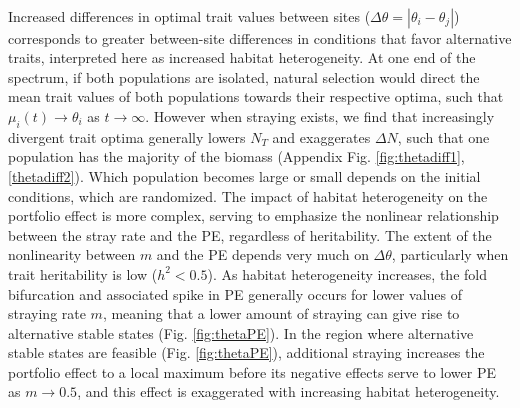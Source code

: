 \documentclass[twocolumn,preprintnumbers,amsmath,amssymb,superscriptaddress]{revtex4}
\begin{document}
\\ 
\noindent Increased differences in optimal trait values between sites ($\Delta\theta = \left|\theta_i - \theta_j\right|$) corresponds to greater between-site differences in conditions that favor alternative traits, interpreted here as increased habitat heterogeneity.
At one end of the spectrum, if both populations are isolated, natural selection would direct the mean trait values of both populations towards their respective optima, such that $\mu_i(t) \rightarrow \theta_i$ as $t\rightarrow\infty$.
However when straying exists, we find that increasingly divergent trait optima generally lowers $N_T$ and exaggerates $\Delta N$, such that one population has the majority of the biomass (Appendix Fig. \ref{fig:thetadiff1},\ref{thetadiff2}).
Which population becomes large or small depends on the initial conditions, which are randomized. 
The impact of habitat heterogeneity on the portfolio effect is more complex, serving to emphasize the nonlinear relationship between the stray rate and the PE, regardless of heritability.
The extent of the nonlinearity between $m$ and the PE depends very much on $\Delta\theta$, particularly when trait heritability is low ($h^2<0.5$).
As habitat heterogeneity increases, the fold bifurcation and associated spike in PE generally occurs for lower values of straying rate $m$, meaning that a lower amount of straying can give rise to alternative stable states (Fig. \ref{fig:thetaPE}).
In the region where alternative stable states are feasible (Fig. \ref{fig:thetaPE}), additional straying increases the portfolio effect to a local maximum before its negative effects serve to lower PE as $m\rightarrow 0.5$, and this effect is exaggerated with increasing habitat heterogeneity.
\\

% 
\end{document}
